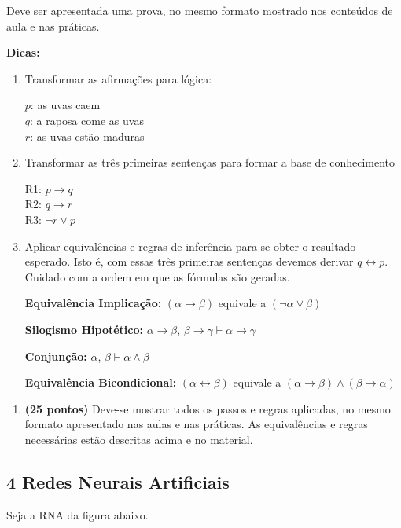     Deve ser apresentada uma prova, no mesmo formato mostrado nos conteúdos de aula e nas práticas.

    \begin{adjustwidth}{1em}{}
    \textbf{Dicas:}
    \end{adjustwidth}
    \begin{enumerate}[label=\arabic*.]
        \item Transformar as afirmações para lógica:

        $p$: as uvas caem \\
        $q$: a raposa come as uvas \\
        $r$: as uvas estão maduras

        \item Transformar as três primeiras sentenças para formar a base de conhecimento

        R1: $p \rightarrow q$ \\
        R2: $q \rightarrow r$ \\
        R3: $\neg r \vee p$

        \item Aplicar equivalências e regras de inferência para se obter o resultado esperado. Isto é, com essas três primeiras sentenças devemos derivar $q \leftrightarrow p$. Cuidado com a ordem em que as fórmulas são geradas.

        \textbf{Equivalência Implicação:} $(\alpha \rightarrow \beta)$ equivale a $(\neg \alpha \vee \beta)$

        \textbf{Silogismo Hipotético:} $\alpha \rightarrow \beta$, $\beta \rightarrow \gamma \vdash \alpha \rightarrow \gamma$

        \textbf{Conjunção:} $\alpha$, $\beta \vdash \alpha \wedge \beta$

        \textbf{Equivalência Bicondicional:} $(\alpha \leftrightarrow \beta)$ equivale a $(\alpha \rightarrow \beta) \wedge (\beta \rightarrow \alpha)$
    \end{enumerate}

    \begin{enumerate}[label=\alph*)]
        \item \textbf{(25 pontos)} Deve-se mostrar todos os passos e regras aplicadas, no mesmo formato apresentado nas aulas e nas práticas. As equivalências e regras necessárias estão descritas acima e no material.
    \end{enumerate}

\subsection*{\textbf{4 Redes Neurais Artificiais}}
    Seja a RNA da figura abaixo.
    
